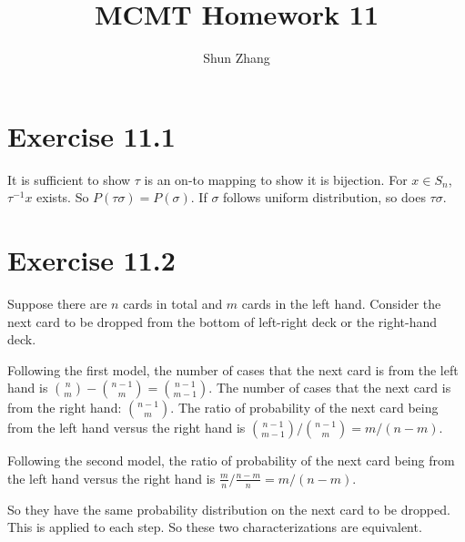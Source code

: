 \documentclass[10pt]{article}
\title{MCMT Homework 11}
\author{Shun Zhang}
\date{}
\begin{document}
\maketitle

\section*{Exercise 11.1}

It is sufficient to show $\tau$ is an on-to mapping to show it is bijection. For
$x \in S_n$, $\tau^{-1} x$ exists. So $P(\tau \sigma) = P(\sigma)$. If
$\sigma$ follows uniform distribution, so does $\tau \sigma$.

\section*{Exercise 11.2}

Suppose there are $n$ cards in total and $m$ cards in the left hand. Consider
the next card to be dropped from the bottom of left-right deck or the right-hand
deck.

Following the first model, the number of cases that the next card is from the
left hand is ${n \choose m} - {n-1 \choose m} = {n-1 \choose m-1}$.
The number of cases that the next card is from the right hand: ${n-1 \choose
m}$.
The ratio of probability of the next card being from the left hand versus the
right hand is ${n-1 \choose m-1} / {n-1 \choose m} = m / (n - m)$.

Following the second model, the ratio of probability of the next card being from
the left hand versus the right hand is $\frac{m}{n} / \frac{n-m}{n} = m / (n -
m)$.

So they have the same probability distribution on the next card to be dropped.
This is applied to each step. So these two characterizations are equivalent.
\end{document}
